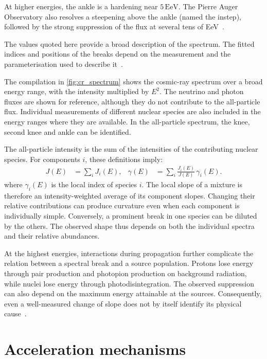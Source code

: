 \documentclass[main.tex]{subfiles}
\begin{document}
At higher energies, the ankle is a hardening near $5\,\mathrm{EeV}$.
The Pierre Auger Observatory also resolves a steepening above the ankle (named the instep), followed by the strong suppression of the flux at several tens of EeV~\cite{PierreAuger:2020:Spectrum}.

The values quoted here provide a broad description of the spectrum.
The fitted indices and positions of the breaks depend on the measurement and the parameterisation used to describe it~\cite{PDG:2025:CosmicRays}.

The compilation in \cref{fig:cr_spectrum} shows the cosmic-ray spectrum over a broad energy range, with the intensity multiplied by $E^2$.
The neutrino and photon fluxes are shown for reference, although they do not contribute to the all-particle flux.
Individual measurements of different nuclear species are also included in the energy ranges where they are available.
In the all-particle spectrum, the knee, second knee and ankle can be identified.

The all-particle intensity is the sum of the intensities of the contributing nuclear species.
For components $i$, these definitions imply:
\begin{align}
    J(E)&=\sum_i J_i(E), &
    \gamma(E)&=\sum_i\frac{J_i(E)}{J(E)}\,\gamma_i(E) .
    \label{eq:cr_mixture}
\end{align}
where $\gamma_i(E)$ is the local index of species $i$.
The local slope of a mixture is therefore an intensity-weighted average of its component slopes.
Changing their relative contributions can produce curvature even when each component is individually simple.
Conversely, a prominent break in one species can be diluted by the others.
The observed shape thus depends on both the individual spectra and their relative abundances.

At the highest energies, interactions during propagation further complicate the relation between a spectral break and a source population.
Protons lose energy through pair production and photopion production on background radiation, while nuclei lose energy through photodisintegration.
The observed suppression can also depend on the maximum energy attainable at the sources.
Consequently, even a well-measured change of slope does not by itself identify its physical cause~\cite{Aloisio:2012:Transition}.

\section{Acceleration mechanisms}
\label{sec:cr_acceleration}
\end{document}
